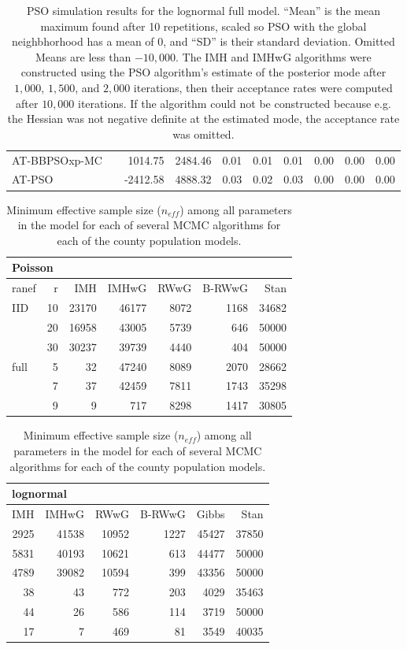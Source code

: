 \documentclass[12pt]{article}
\begin{document}
\begin{table}[h]
{\begin{tabular}{llrr|rrr|rrr}
  AT-BBPSOxp-MC &  & 1014.75 & 2484.46 & 0.01 & 0.01 & 0.01 & 0.00 & 0.00 & 0.00 \\ 
  AT-PSO &  & -2412.58 & 4888.32 & 0.03 & 0.02 & 0.03 & 0.00 & 0.00 & 0.00 \\ 
   \hline
\end{tabular}
}
\label{tab:psolnormfull}
\caption{PSO simulation results for the lognormal full model. ``Mean'' is the mean maximum found after 10 repetitions, scaled so PSO with the global neighbhorhood has a mean of 0, and ``SD'' is their standard deviation. Omitted Means are less than $-10,000$. The IMH and IMHwG algorithms were constructed using the PSO algorithm's estimate of the posterior mode after $1,000$, $1,500$, and $2,000$ iterations, then their acceptance rates were computed after $10,000$ iterations. If the algorithm could not be constructed because e.g. the Hessian was not negative definite at the estimated mode, the acceptance rate was omitted.}
\end{table}

\begin{table}[ht]
\centering
\tiny{
\begin{tabular}{lr|rrrrr}
\multicolumn{7}{l}{Poisson}\\
  \hline
ranef &r & IMH & IMHwG & RWwG & B-RWwG & Stan \\ 
  \hline
IID & 10 & 23170 & 46177 & 8072 & 1168 & 34682 \\ 
    &  20 & 16958 & 43005 & 5739 & 646 & 50000 \\ 
    &  30 & 30237 & 39739 & 4440 & 404 & 50000 \\ \hline
full&  5 & 32 & 47240 & 8089 & 2070 & 28662 \\ 
    & 7 & 37 & 42459 & 7811 & 1743 & 35298 \\ 
    & 9 & 9 & 717 & 8298 & 1417 & 30805 \\ 
   \hline
\end{tabular}
\begin{tabular}{rrrrrr}
\multicolumn{6}{l}{lognormal}\\
  \hline
 IMH & IMHwG & RWwG & B-RWwG & Gibbs & Stan \\ 
  \hline
 2925 & 41538 & 10952 & 1227 & 45427 & 37850 \\ 
 5831 & 40193 & 10621 & 613 & 44477 & 50000 \\ 
 4789 & 39082 & 10594 & 399 & 43356 & 50000 \\ \hline
 38 & 43 & 772 & 203 & 4029 & 35463 \\ 
 44 & 26 & 586 & 114 & 3719 & 50000 \\ 
 17 & 7 & 469 & 81 & 3549 & 40035 \\ 
   \hline
\end{tabular}
}
\label{tab:mcmcpopneff}
\caption{Minimum effective sample size ($n_{eff}$) among all parameters in the model for each of several MCMC algorithms for each of the county population models.}
\end{table}
\end{document}
